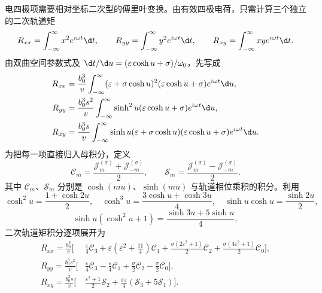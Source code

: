 电四极项需要相对坐标二次型的傅里叶变换。由有效四极电荷，只需计算三个独立的二次轨道矩
\begin{equation*}
	R_{xx}=\int_{-\infty}^{\infty}x^2e^{i\omega t}\d t,
	\qquad
	R_{yy}=\int_{-\infty}^{\infty}y^2e^{i\omega t}\d t,
	\qquad
	R_{xy}=\int_{-\infty}^{\infty}xye^{i\omega t}\d t.
\end{equation*}
由双曲空间参数式及 $\d t/\d u=(\varepsilon\cosh u+\sigma)/\omega_0$，先写成
\begin{equation*}
	\begin{aligned}
	R_{xx}&=\frac{b_0^3}{v}\int_{-\infty}^{\infty}
	(\varepsilon+\sigma\cosh u)^2(\varepsilon\cosh u+\sigma)e^{i\omega t}\d u,\\
	R_{yy}&=\frac{b_0^3s^2}{v}\int_{-\infty}^{\infty}
	\sinh^2u(\varepsilon\cosh u+\sigma)e^{i\omega t}\d u,\\
	R_{xy}&=\frac{b_0^3s}{v}\int_{-\infty}^{\infty}
	\sinh u(\varepsilon+\sigma\cosh u)(\varepsilon\cosh u+\sigma)e^{i\omega t}\d u.
	\end{aligned}
\end{equation*}
为把每一项直接归入母积分，定义
\begin{equation*}
	\mathcal C_m=\frac{\mathcal J_m^{(\sigma)}+\mathcal J_{-m}^{(\sigma)}}{2},
	\qquad
	\mathcal S_m=\frac{\mathcal J_m^{(\sigma)}-\mathcal J_{-m}^{(\sigma)}}{2}.
\end{equation*}
其中 $\mathcal C_m$、$\mathcal S_m$ 分别是 $\cosh(mu)$、$\sinh(mu)$ 与轨道相位乘积的积分。利用
\begin{equation*}
	\cosh^2u=\frac{1+\cosh2u}{2},
	\quad
	\cosh^3u=\frac{3\cosh u+\cosh3u}{4},
	\quad
	\sinh u\cosh u=\frac{\sinh2u}{2},
\end{equation*}
\begin{equation*}
	\sinh u(\cosh^2u+1)=\frac{\sinh3u+5\sinh u}{4},
\end{equation*}
二次轨道矩积分逐项展开为
\begin{equation*}
	\begin{aligned}
	R_{xx}=\frac{b_0^3}{v}\bigg[&
	\frac{\varepsilon}{4}\mathcal C_3
	+\varepsilon\left(\varepsilon^2+\frac{11}{4}\right)\mathcal C_1
	+\frac{\sigma(2\varepsilon^2+1)}{2}\mathcal C_2
	+\frac{\sigma(4\varepsilon^2+1)}{2}\mathcal C_0\bigg],\\
	R_{yy}=\frac{b_0^3s^2}{v}\bigg[&
	\frac{\varepsilon}{4}\mathcal C_3
	-\frac{\varepsilon}{4}\mathcal C_1
	+\frac{\sigma}{2}\mathcal C_2
	-\frac{\sigma}{2}\mathcal C_0\bigg],\\
	R_{xy}=\frac{b_0^3s}{v}\bigg[&
	\frac{\varepsilon^2+1}{2}\mathcal S_2
	+\frac{\sigma\varepsilon}{4}
	\left(\mathcal S_3+5\mathcal S_1\right)\bigg].
	\end{aligned}
\end{equation*}

